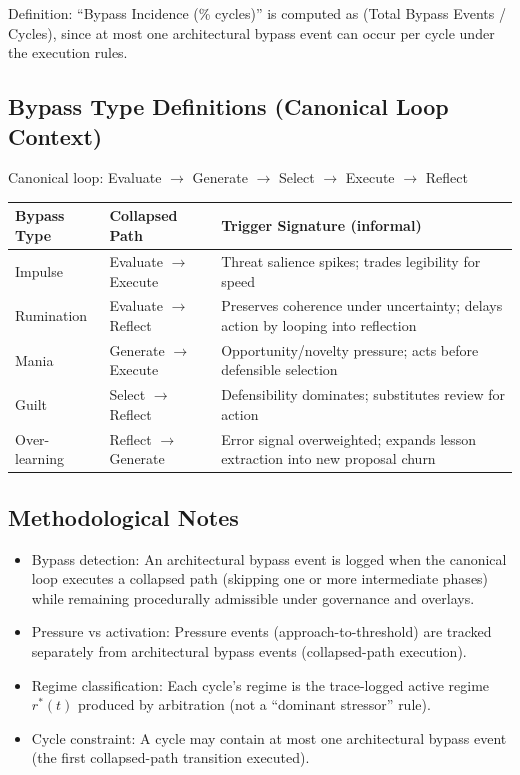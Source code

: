 \documentclass[11pt,a4paper]{article}
\begin{document}
Definition: ``Bypass Incidence (\% cycles)'' is computed as (Total Bypass Events / Cycles), since at most one architectural bypass event can occur per cycle under the execution rules.

\subsection*{Bypass Type Definitions (Canonical Loop Context)}

Canonical loop: Evaluate $\to$ Generate $\to$ Select $\to$ Execute $\to$ Reflect

\begin{center}
\begin{tabular}{lll}
\toprule
\textbf{Bypass Type} & \textbf{Collapsed Path} & \textbf{Trigger Signature (informal)} \\
\midrule
Impulse & Evaluate $\to$ Execute & Threat salience spikes; trades legibility for speed \\
Rumination & Evaluate $\to$ Reflect & Preserves coherence under uncertainty; delays action by looping into reflection \\
Mania & Generate $\to$ Execute & Opportunity/novelty pressure; acts before defensible selection \\
Guilt & Select $\to$ Reflect & Defensibility dominates; substitutes review for action \\
Over-learning & Reflect $\to$ Generate & Error signal overweighted; expands lesson extraction into new proposal churn \\
\bottomrule
\end{tabular}
\end{center}

\subsection*{Methodological Notes}

\begin{itemize}
    \item Bypass detection: An architectural bypass event is logged when the canonical loop executes a collapsed path (skipping one or more intermediate phases) while remaining procedurally admissible under governance and overlays.
    \item Pressure vs activation: Pressure events (approach-to-threshold) are tracked separately from architectural bypass events (collapsed-path execution).
    \item Regime classification: Each cycle's regime is the trace-logged active regime $r^*(t)$ produced by arbitration (not a ``dominant stressor'' rule).
    \item Cycle constraint: A cycle may contain at most one architectural bypass event (the first collapsed-path transition executed).
\end{itemize}
\end{document}
